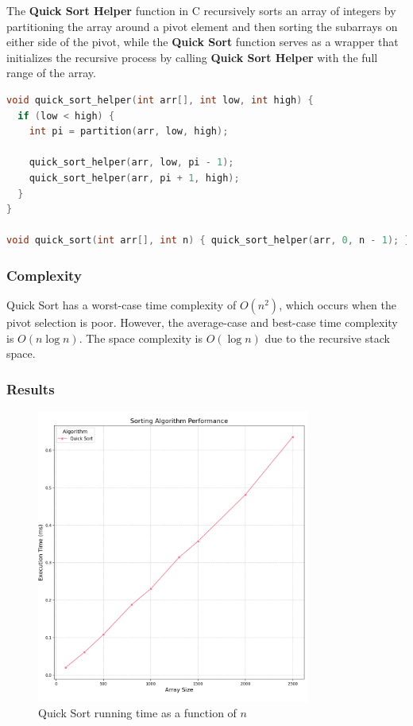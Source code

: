 \documentclass{article}
\begin{document}
The \textbf{Quick Sort Helper} function in C recursively sorts an array of integers by partitioning the array around a pivot element and then sorting the subarrays on either side of the pivot, while the \textbf{Quick Sort} function serves as a wrapper that initializes the recursive process by calling \textbf{Quick Sort Helper} with the full range of the array.

\begin{lstlisting}[language=C, caption=Quick Sort implementation]
void quick_sort_helper(int arr[], int low, int high) {
  if (low < high) {
    int pi = partition(arr, low, high);

    quick_sort_helper(arr, low, pi - 1);
    quick_sort_helper(arr, pi + 1, high);
  }
}

void quick_sort(int arr[], int n) { quick_sort_helper(arr, 0, n - 1); }
\end{lstlisting}

\subsubsection{Complexity}
Quick Sort has a worst-case time complexity of $O(n^2)$, which occurs when the pivot selection is poor. However, the average-case and best-case time complexity is $O(n \log n)$. The space complexity is $O(\log n)$ due to the recursive stack space.

\subsubsection{Results}
\begin{figure}[H]
	\includegraphics[width=0.8\textwidth]{images/quick_sort.png}
	\caption{Quick Sort running time as a function of $n$}
\end{figure}
\end{document}
